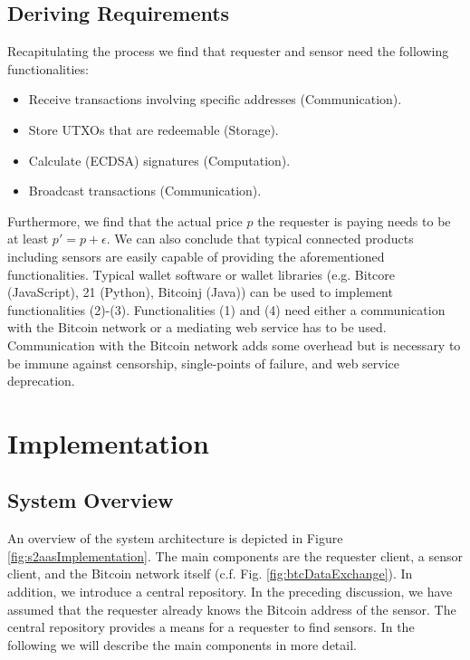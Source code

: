 \subsection{Deriving Requirements}
\label{sec:s2aas_requirements}

Recapitulating the process we find that requester and sensor need the following functionalities:
\begin{itemize}
\item Receive transactions involving specific addresses (Communication).
\item Store UTXOs that are redeemable (Storage).
\item Calculate (\ac{ECDSA}) signatures (Computation).
\item Broadcast transactions (Communication).
\end{itemize}
Furthermore, we find that the actual price $p$ the requester is paying needs to be at least $p'=p+\epsilon$.  
We can also conclude that typical connected products including sensors are easily capable of providing the aforementioned functionalities. Typical wallet software or wallet libraries (e.g. Bitcore (JavaScript), 21 (Python), Bitcoinj (Java)) can be used to implement functionalities (2)-(3). Functionalities (1) and (4) need either a communication with the Bitcoin network or a mediating web service has to be used. Communication with the Bitcoin network adds some overhead but is necessary to be immune against censorship, single-points of failure, and web service deprecation.

\section{Implementation}
\label{sec:s2aas_implementation}

\subsection{System Overview}

An overview of the system architecture is depicted in Figure \ref{fig:s2aasImplementation}. The main components are the requester client, a sensor client, and the Bitcoin network itself (c.f. Fig. \ref{fig:btcDataExchange}). In addition, we introduce a central repository. In the preceding discussion, we have assumed that the requester already knows the Bitcoin address of the sensor. The central repository provides a means for a requester to find sensors. In the following we will describe the main components in more detail. 


